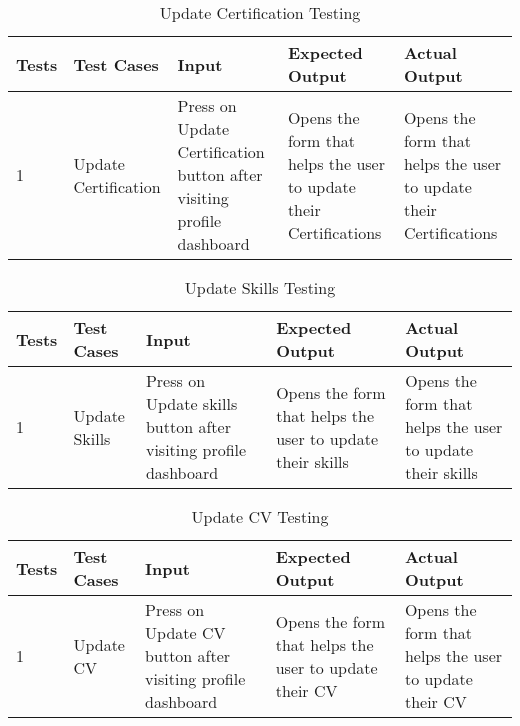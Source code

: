 \begin{table}[H]
    \caption{Update Certification Testing}
        \label{}
    \begin{tabular}{|p{0.3in}|p{1.2in}|p{1.2in}|p{1.2in}|p{1in}|}
        \hline
        Tests & Test Cases & Input &Expected Output & Actual Output \\
        \hline
            1 &Update Certification & Press on Update Certification button after visiting profile dashboard &Opens the form that helps the user to update their Certifications  &Opens the form that helps the user to update their Certifications  \\
            \hline
\end{tabular}
\end{table}


\begin{table}[H]
    \caption{Update Skills Testing}
        \label{}
    \begin{tabular}{|p{0.3in}|p{1.2in}|p{1.2in}|p{1.2in}|p{1in}|}
        \hline
        Tests & Test Cases & Input &Expected Output & Actual Output \\
        \hline
            1 &Update Skills & Press on Update skills button after visiting profile dashboard &Opens the form that helps the user to update their skills  &Opens the form that helps the user to update their skills  \\
            \hline
\end{tabular}
\end{table}

\begin{table}[H]
    \caption{Update CV Testing}
        \label{}
    \begin{tabular}{|p{0.3in}|p{1.2in}|p{1.2in}|p{1.2in}|p{1in}|}
        \hline
        Tests & Test Cases & Input &Expected Output & Actual Output \\
        \hline
            1 &Update CV & Press on Update CV button after visiting profile dashboard &Opens the form that helps the user to update their CV  &Opens the form that helps the user to update their CV  \\
            \hline
\end{tabular}
\end{table}


